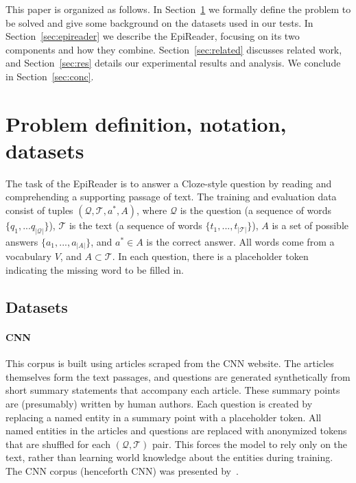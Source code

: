 \documentclass[11pt,letterpaper]{article}
\begin{document}
This paper is organized as follows. In Section~\ref{sec:probnote} we formally define the problem to be solved and give some background on the datasets used in our tests. In Section~\ref{sec:epireader} we describe the EpiReader, focusing on its two components and how they combine. Section~\ref{sec:related} discusses related work, and Section~\ref{sec:res} details our experimental results and analysis. We conclude in Section~\ref{sec:conc}.

\section{Problem definition, notation, datasets}
\label{sec:probnote}
The task of the EpiReader is to answer a Cloze-style question by reading and comprehending a supporting passage of text. The training and evaluation data consist of tuples $(\mathcal{Q}, \mathcal{T}, a^{\ast}, A)$, where $\mathcal{Q}$ is the question (a sequence of words $\{q_1,...q_{|\mathcal{Q}|}\}$), $\mathcal{T}$ is the text (a sequence of words $\{t_1,...,t_{|\mathcal{T}|}\}$), $A$ is a set of possible answers $\{a_1,...,a_{|A|}\}$, and $a^{\ast} \in A$ is the correct answer. All words come from a vocabulary $V$, and $A \subset \mathcal{T}$. In each question, there is a placeholder token indicating the missing word to be filled in.



\subsection{Datasets}
\paragraph{CNN} This corpus is built using articles scraped from the CNN website. The articles themselves form the text passages, and questions are generated synthetically from short summary statements that accompany each article. These summary points are (presumably) written by human authors. Each question is created by replacing a named entity in a summary point with a placeholder token. All named entities in the articles and questions are replaced with anonymized tokens that are shuffled for each $(\mathcal{Q}, \mathcal{T})$ pair. This forces the model to rely only on the text, rather than learning world knowledge about the entities during training. The CNN corpus (henceforth CNN) was presented by~.
\end{document}
